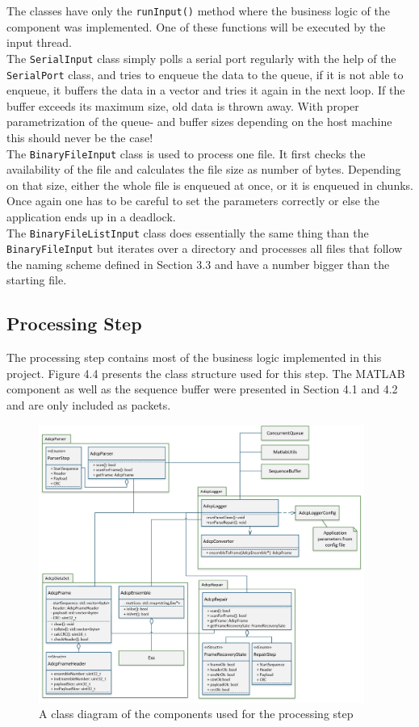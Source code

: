 The classes have only the \texttt{runInput()} method where the business logic of the component was implemented. One of these functions will be executed by the input thread. \\ 
The \texttt{SerialInput} class simply polls a serial port regularly with the help of the \texttt{SerialPort} class, and tries to enqueue the data to the queue, if it is not able to enqueue, it buffers the data in a vector and tries it again in the next loop. If the buffer exceeds its maximum size, old data is thrown away. With proper parametrization of the queue- and buffer sizes depending on the host machine this should never be the case!\\
The \texttt{BinaryFileInput} class is used to process one file. It first checks the availability of the file and calculates the file size as number of bytes. Depending on that size, either the whole file is enqueued at once, or it is enqueued in chunks. Once again one has to be careful to set the parameters correctly or else the application ends up  in a deadlock.\\
The \texttt{BinaryFileListInput} class does essentially the same thing than the \texttt{BinaryFileInput} but iterates over a directory and processes all files that follow the naming scheme defined in Section 3.3 and have a number bigger than the starting file.
\subsection{Processing Step}
The processing step contains most of the business logic implemented in this project. Figure 4.4 presents the class structure used for this step. The MATLAB component as well as the sequence buffer were presented in Section 4.1 and 4.2 and are only included as packets.

\begin{figure}[h]
\centering
      \includegraphics[width=0.95\textwidth]{logger_class}
        \caption{A class diagram of the components used for the processing step}
\end{figure}

